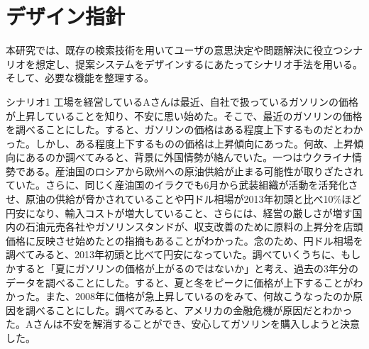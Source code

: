 \documentclass{matsushita-zemi}
\begin{document}
\section{デザイン指針}
本研究では、既存の検索技術を用いてユーザの意思決定や問題解決に役立つシナリオを想定し、提案システムをデザインするにあたってシナリオ手法を用いる。そして、必要な機能を整理する。\begin{itembox}[l]{シナリオ1}
工場を経営しているAさんは最近、自社で扱っているガソリンの価格が上昇していることを知り、不安に思い始めた。そこで、最近のガソリンの価格を調べることにした。すると、ガソリンの価格はある程度上下するものだとわかった。しかし、ある程度上下するものの価格は上昇傾向にあった。何故、上昇傾向にあるのか調べてみると、背景に外国情勢が絡んでいた。一つはウクライナ情勢である。産油国のロシアから欧州への原油供給が止まる可能性が取りざたされていた。さらに、同じく産油国のイラクでも6月から武装組織が活動を活発化させ、原油の供給が脅かされていることや円ドル相場が2013年初頭と比べ10\%ほど円安になり、輸入コストが増大していること、さらには、経営の厳しさが増す国内の石油元売各社やガソリンスタンドが、収支改善のために原料の上昇分を店頭価格に反映させ始めたとの指摘もあることがわかった。念のため、円ドル相場を調べてみると、2013年初頭と比べて円安になっていた。調べていくうちに、もしかすると「夏にガソリンの価格が上がるのではないか」と考え、過去の3年分のデータを調べることにした。すると、夏と冬をピークに価格が上下することがわかった。また、2008年に価格が急上昇しているのをみて、何故こうなったのか原因を調べることにした。調べてみると、アメリカの金融危機が原因だとわかった。Aさんは不安を解消することができ、安心してガソリンを購入しようと決意した。
\end{itembox}
\end{document}
